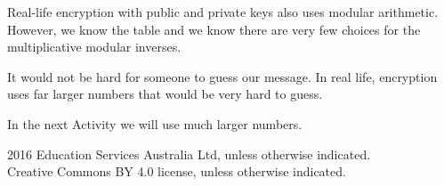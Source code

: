 \documentclass[11pt,a4paper]{article}
\begin{document}
\vspace{1cm}

Real-life encryption with public and private keys also uses modular arithmetic. However, we know the table and we know there are very few choices for the multiplicative modular inverses.

It would not be hard for someone to guess our message. In real life, encryption uses far larger numbers that would be very hard to guess.

In the next Activity we will use much larger numbers.

\vfill

\noindent\small
\textcopyright{} 2016 Education Services Australia Ltd, unless otherwise indicated.\\
Creative Commons BY 4.0 license, unless otherwise indicated.
\end{document}
